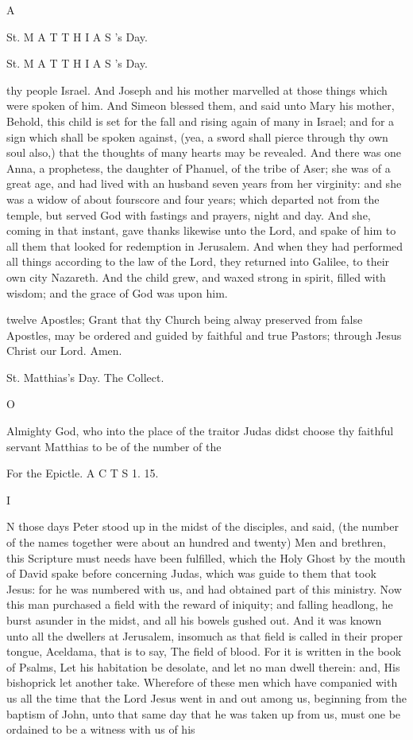 A

St. M A T T H I A S ’s Day.

St. M A T T H I A S ’s Day.

thy people Israel. And Joseph and his mother marvelled at those things which were spoken of him. And Simeon blessed them, and said unto Mary his mother, Behold, this child is set for the fall and rising again of many in Israel; and for a sign which shall be spoken against, (yea, a sword shall pierce through thy own soul also,) that the thoughts of many hearts may be revealed. And there was one Anna, a prophetess, the daughter of Phanuel, of the tribe of Aser; she was of a great age, and had lived with an husband seven years from her virginity: and she was a widow of about fourscore and four years; which departed not from the temple, but served God with fastings and prayers, night and day. And she, coming in that instant, gave thanks likewise unto the Lord, and spake of him to all them that looked for redemption in Jerusalem. And when they had performed all things according to the law of the Lord, they returned into Galilee, to their own city Nazareth. And the child grew, and waxed strong in spirit, filled with wisdom; and the grace of God was upon him.

twelve Apostles; Grant that thy Church being alway preserved from false Apostles, may be ordered and guided by faithful and true Pastors; through Jesus Christ our Lord. Amen.

St. Matthias’s Day. The Collect.

O

Almighty God, who into the place of the traitor Judas didst choose thy faithful servant Matthias to be of the number of the

For the Epictle. A C T S 1. 15.

I

N those days Peter stood up in the midst of the disciples, and said, (the number of the names together were about an hundred and twenty) Men and brethren, this Scripture must needs have been fulfilled, which the Holy Ghost by the mouth of David spake before concerning Judas, which was guide to them that took Jesus: for he was numbered with us, and had obtained part of this ministry. Now this man purchased a field with the reward of iniquity; and falling headlong, he burst asunder in the midst, and all his bowels gushed out. And it was known unto all the dwellers at Jerusalem, insomuch as that field is called in their proper tongue, Aceldama, that is to say, The field of blood. For it is written in the book of Psalms, Let his habitation be desolate, and let no man dwell therein: and, His bishoprick let another take. Wherefore of these men which have companied with us all the time that the Lord Jesus went in and out among us, beginning from the baptism of John, unto that same day that he was taken up from us, must one be ordained to be a witness with us of his

